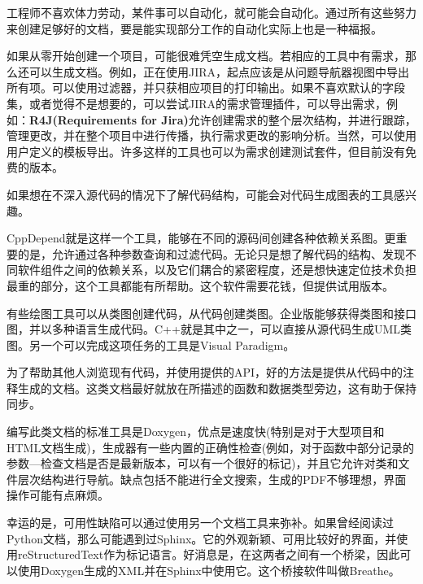 
工程师不喜欢体力劳动，某件事可以自动化，就可能会自动化。通过所有这些努力来创建足够好的文档，要是能实现部分工作的自动化实际上也是一种福报。


如果从零开始创建一个项目，可能很难凭空生成文档。若相应的工具中有需求，那么还可以生成文档。例如，正在使用JIRA，起点应该是从问题导航器视图中导出所有项。可以使用过滤器，并只获相应项目的打印输出。如果不喜欢默认的字段集，或者觉得不是想要的，可以尝试JIRA的需求管理插件，可以导出需求，例如：\textbf{R4J(Requirements for Jira)}允许创建需求的整个层次结构，并进行跟踪，管理更改，并在整个项目中进行传播，执行需求更改的影响分析。当然，可以使用用户定义的模板导出。许多这样的工具也可以为需求创建测试套件，但目前没有免费的版本。


如果想在不深入源代码的情况下了解代码结构，可能会对代码生成图表的工具感兴趣。

CppDepend就是这样一个工具，能够在不同的源码间创建各种依赖关系图。更重要的是，允许通过各种参数查询和过滤代码。无论只是想了解代码的结构、发现不同软件组件之间的依赖关系，以及它们耦合的紧密程度，还是想快速定位技术负担最重的部分，这个工具都能有所帮助。这个软件需要花钱，但提供试用版本。

有些绘图工具可以从类图创建代码，从代码创建类图。企业版能够获得类图和接口图，并以多种语言生成代码。C++就是其中之一，可以直接从源代码生成UML类图。另一个可以完成这项任务的工具是Visual Paradigm。


为了帮助其他人浏览现有代码，并使用提供的API，好的方法是提供从代码中的注释生成的文档。这类文档最好就放在所描述的函数和数据类型旁边，这有助于保持同步。

编写此类文档的标准工具是Doxygen，优点是速度快(特别是对于大型项目和HTML文档生成)，生成器有一些内置的正确性检查(例如，对于函数中部分记录的参数—检查文档是否是最新版本，可以有一个很好的标记)，并且它允许对类和文件层次结构进行导航。缺点包括不能进行全文搜索，生成的PDF不够理想，界面操作可能有点麻烦。

幸运的是，可用性缺陷可以通过使用另一个文档工具来弥补。如果曾经阅读过Python文档，那么可能遇到过Sphinx。它的外观新颖、可用比较好的界面，并使用reStructuredText作为标记语言。好消息是，在这两者之间有一个桥梁，因此可以使用Doxygen生成的XML并在Sphinx中使用它。这个桥接软件叫做Breathe。

